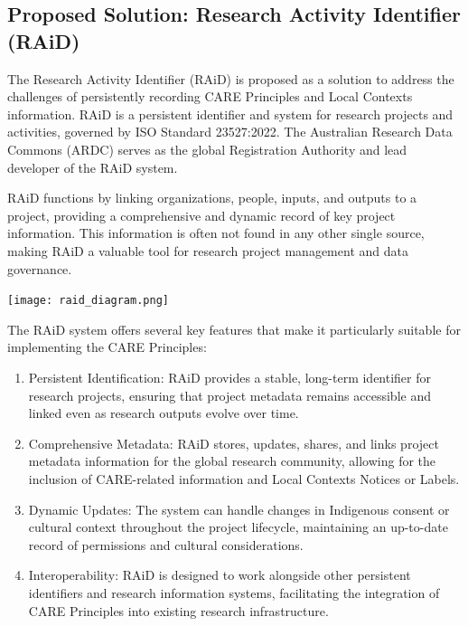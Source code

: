 \documentclass[a0,portrait]{a0poster}
\begin{document}
\begin{multicols}{2}
\color{ARDCBlue}
\section*{\LARGE Proposed Solution: Research Activity Identifier (RAiD)}
\color{DarkGrey}
\large{
The Research Activity Identifier (RAiD) is proposed as a solution to address the challenges of persistently recording CARE Principles and Local Contexts information. RAiD is a persistent identifier and system for research projects and activities, governed by ISO Standard 23527:2022. The Australian Research Data Commons (ARDC) serves as the global Registration Authority and lead developer of the RAiD system.

RAiD functions by linking organizations, people, inputs, and outputs to a project, providing a comprehensive and dynamic record of key project information. This information is often not found in any other single source, making RAiD a valuable tool for research project management and data governance.

\texttt{[image: raid\_diagram.png]}

The RAiD system offers several key features that make it particularly suitable for implementing the CARE Principles:

\begin{enumerate}
  \item Persistent Identification: RAiD provides a stable, long-term identifier for research projects, ensuring that project metadata remains accessible and linked even as research outputs evolve over time.
  \item Comprehensive Metadata: RAiD stores, updates, shares, and links project metadata information for the global research community, allowing for the inclusion of CARE-related information and Local Contexts Notices or Labels.
  \item Dynamic Updates: The system can handle changes in Indigenous consent or cultural context throughout the project lifecycle, maintaining an up-to-date record of permissions and cultural considerations.
  \item Interoperability: RAiD is designed to work alongside other persistent identifiers and research information systems, facilitating the integration of CARE Principles into existing research infrastructure.
\end{enumerate}

}
\end{multicols}
\end{document}
